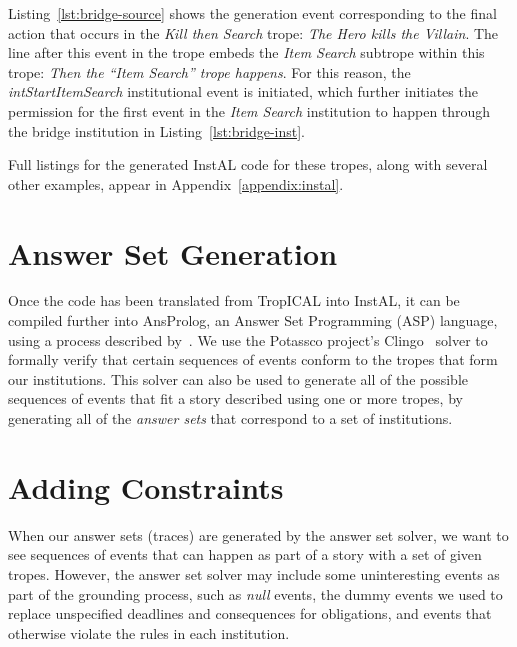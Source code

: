 \documentclass[11pt]{report}
\begin{document}
Listing~\ref{lst:bridge-source} shows the generation event corresponding to the
final action that occurs in the \emph{Kill then Search} trope: \emph{The Hero
  kills the Villain}. The line after this event in the trope embeds the
\emph{Item Search} subtrope within this trope: \emph{Then the ``Item Search''
  trope happens}. For this reason, the \emph{intStartItemSearch} institutional
event is initiated, which further initiates the permission for the first event
in the \emph{Item Search} institution to happen through the bridge institution
in Listing~\ref{lst:bridge-inst}.

Full listings for the generated InstAL code for these tropes, along with several
other examples, appear in Appendix~\ref{appendix:instal}.

\section{Answer Set Generation}
\label{sec:t-asp}

Once the code has been translated from TropICAL into InstAL, it can be compiled
further into AnsProlog, an Answer Set Programming (ASP) language, using a
process described by~\citet{cliffe2007specifying}. We use the
Potassco project's Clingo~\citep{gebser2011potassco} solver to formally verify
that certain sequences of events conform to the tropes that form our
institutions. This solver can also be used to generate all of the possible
sequences of events that fit a story described using one or more tropes, by
generating all of the \emph{answer sets} that correspond to a set of institutions.


\section{Adding Constraints}
\label{sec:t-constraints}
When our answer sets (traces) are generated by the answer set solver, we want to
see sequences of events that can happen as part of a story with a set
of given tropes. However, the answer set solver may include some uninteresting
events as part of the grounding process, such as \emph{null} events, the dummy
events we used to replace unspecified deadlines and consequences for
obligations, and events that otherwise violate the rules in each institution.
\end{document}
